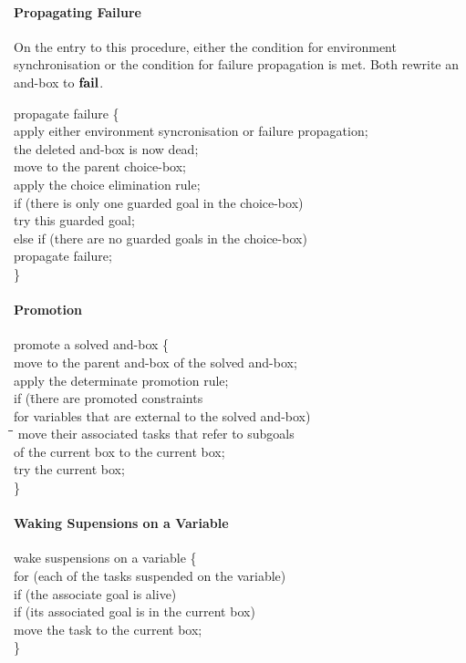 \paragraph{Propagating Failure}
On the entry to this procedure, either the condition for environment
synchronisation or the condition for failure propagation is met.  Both
rewrite an and-box to $\mbox{\bf fail}$.
\begin{program}
propagate failure \{\\
\>apply either environment syncronisation or failure propagation;\\
\>the deleted and-box is now dead;\\
\>move to the parent choice-box;\\
\>apply the choice elimination rule;\\
\>if (there is only one guarded goal in the choice-box)\\
\>\>try this guarded goal;\\
\>else if (there are no guarded goals in the choice-box)\\
\>\>propagate failure;\\
\}
\end{program}

\paragraph{Promotion}
\begin{program}
promote a solved and-box \{\\
\>move to the parent and-box of the solved and-box;\\
\>apply the determinate promotion rule;\\
\>if (\=there are promoted constraints\\
\>    \>for variables that are external to the solved and-box)\\
\hskip1cm\=\hskip1cm\=\hskip1cm\=\hskip1cm\kill
\>\>move their associated tasks that refer to subgoals\\
\>\>\>of the current box to the current box;\\
\>try the current box;\\
\}
\end{program}

\paragraph{Waking Supensions on a Variable}
\begin{program}
wake suspensions on a variable \{\\
\>for (each of the tasks suspended on the variable)\\
\>\>if (the associate goal is alive)\\
\>\>\>if (its associated goal is in the current box)\\
\>\>\>\>move the task to the current box;\\
\}
\end{program}

